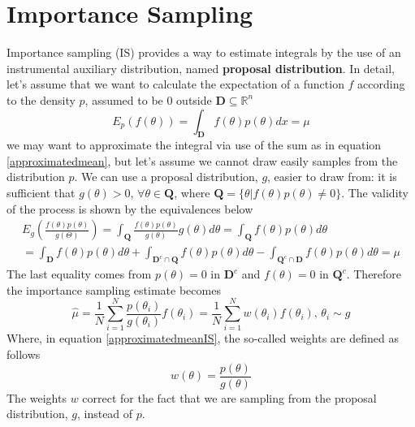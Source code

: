 \documentclass[12pt,mythesisstyle]{report}
\begin{document}
\section{Importance Sampling}\label{section:IS}
Importance sampling (IS) provides a way to estimate integrals by the use of an instrumental auxiliary distribution, named \textbf{proposal distribution}. In detail, let's assume that we want to calculate the expectation of a function $f$ according to the density $p$, assumed to be $0$ outside $\mathbf{D} \subseteq \mathbb{R}^n$
\begin{equation}\label{expectationis}
E_{p}(f(\theta))=\int_{\mathbf{D}} f(\theta) p(\theta) dx=\mu
\end{equation}
we may want to approximate the integral via use of the sum as in equation \eqref{approximatedmean}, but let's assume we cannot draw easily samples from the distribution $p$. We can use a proposal distribution, $g$, easier to draw from: it is sufficient that $g(\theta)>0$,  $\forall \theta \in \mathbf{Q}$, where $\mathbf{Q}=\{\theta | f(\theta)p(\theta)\neq 0\}$. The validity of the process is shown by the equivalences below \cite{OwenIS}
\begin{equation}\label{equationISweights}
\begin{aligned}
E_{g}(\frac{f(\theta)p(\theta)}{g(\Theta)})=\int_{\mathbf{Q}} \frac{f(\theta)p(\theta)}{g(\theta)}g(\theta) d\theta=\int_{\mathbf{Q}} f(\theta)p(\theta) d\theta \\
=\int_{\mathbf{D}} f(\theta)p(\theta) d\theta + \int_{\mathbf{D}^c \cap \mathbf{Q}} f(\theta)p(\theta) d\theta -
\int_{\mathbf{Q}^c \cap \mathbf{D}} f(\theta)p(\theta) d\theta=\mu
\end{aligned}
\end{equation}
The last equality comes from $p(\theta)=0 \text{ in } \mathbf{D}^c$ and $f(\theta)=0 \text{ in } \mathbf{Q}^c$.
Therefore the importance sampling estimate becomes
\begin{equation}\label{approximatedmeanIS}
\hat{\mu}=\frac{1}{N}\sum_{i=1}^{N}\frac{p(\theta_{i})}{g(\theta_{i})}f(\theta_{i}) =\frac{1}{N}\sum_{i=1}^{N}w(\theta_{i})f(\theta_{i}) \text{, } \theta_i \sim g
\end{equation}
Where, in equation \eqref{approximatedmeanIS}, the so-called weights are defined as follows
\begin{equation}\label{weightseqn_f_on_g}
w(\theta)=\frac{p(\theta)}{g(\theta)}
\end{equation}
The weights $w$ correct for the fact that we are sampling from the proposal distribution, $g$, instead of $p$.
\end{document}
